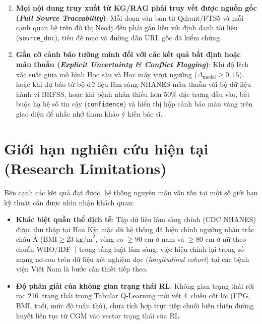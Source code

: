 \begin{enumerate}
  \item \textbf{Mọi nội dung truy xuất từ KG/RAG phải truy vết được nguồn gốc (\emph{Full Source Traceability})}:
  Mỗi đoạn văn bản từ Qdrant/FTS5 và mỗi cạnh quan hệ trên đồ thị Neo4j đều phải gắn liền với định danh tài liệu (\texttt{source\_doc}), tiêu đề mục và đường dẫn URL gốc đã kiểm chứng.

  \item \textbf{Gắn cờ cảnh báo tường minh đối với các kết quả bất định hoặc mâu thuẫn (\emph{Explicit Uncertainty \& Conflict Flagging})}:
  Khi độ lệch xác suất giữa mô hình Học sâu và Học máy vượt ngưỡng ($\Delta_{\text{model}} \ge 0{,}15$), hoặc khi dự báo từ bộ dữ liệu lâm sàng NHANES mâu thuẫn với bộ dữ liệu hành vi BRFSS, hoặc khi bệnh nhân thiếu hơn 50\% đặc trưng đầu vào,  bắt buộc hạ hệ số tin cậy (\texttt{confidence}) và hiển thị hộp cảnh báo màu vàng trên giao diện để nhắc nhở tham khảo ý kiến bác sĩ.
\end{enumerate}

\section{Giới hạn nghiên cứu hiện tại (Research Limitations)}
\label{sec:research-limitations}

Bên cạnh các kết quả đạt được, hệ thống nguyên mẫu vẫn tồn tại một số giới hạn kỹ thuật cần được nhìn nhận khách quan:
\begin{itemize}
  \item \textbf{Khác biệt quần thể dịch tễ}: Tập dữ liệu lâm sàng chính (CDC NHANES) được thu thập tại Hoa Kỳ; mặc dù hệ thống đã hiệu chỉnh ngưỡng nhân trắc châu Á ($\text{BMI} \ge 23\text{ kg/m}^2$, vòng eo $\ge 90\text{ cm}$ ở nam và $\ge 80\text{ cm}$ ở nữ theo chuẩn WHO/IDF~\cite{who2004asian}) trong tầng luật lâm sàng, việc hiệu chỉnh lại trọng số mạng nơ-ron trên dữ liệu xét nghiệm dọc (\emph{longitudinal cohort}) tại các bệnh viện Việt Nam là bước cần thiết tiếp theo.
  \item \textbf{Độ phân giải của không gian trạng thái RL}: Không gian trạng thái rời rạc 216~trạng thái trong Tabular Q-Learning mới xét 4~chiều cốt lõi (FPG, BMI, tuổi, mức độ tuân thủ), chưa tích hợp trực tiếp chuỗi biến thiên đường huyết liên tục từ CGM vào vector trạng thái của RL.
\end{itemize}
